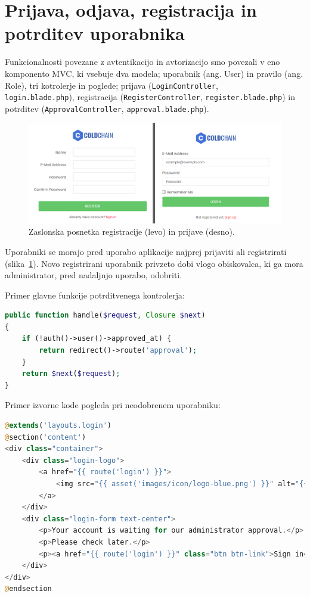 \documentclass[a4paper, 12pt]{book}
\begin{document}
\section{Prijava, odjava, registracija in potrditev uporabnika}

Funkcionalnosti povezane z avtentikacijo in avtorizacijo smo povezali v eno komponento MVC, ki vsebuje dva modela; uporabnik (ang. User) in pravilo (ang. Role), tri kotrolerje in poglede; prijava (\verb=LoginController=, \\ \verb=login.blade.php=), registracija (\verb=RegisterController=, \verb=register.blade.php=) in potrditev (\verb=ApprovalController=, \verb=approval.blade.php=).

\begin{figure}[h]
\begin{center}
\includegraphics[width=\textwidth]{slike/registration_login.png}
\end{center}
\caption{Zaslonska posnetka registracije (levo) in prijave (desno).}
\label{ss-registration-login}
\end{figure}

Uporabniki se morajo pred uporabo aplikacije najprej prijaviti ali registrirati (slika~\ref{ss-registration-login}). Novo registrirani uporabnik privzeto dobi vlogo obiskovalca, ki ga mora administrator, pred nadaljnjo uporabo, odobriti.

Primer glavne funkcije potrditvenega kontrolerja:

\begin{lstlisting}[language=PHP, style=mystyle]
public function handle($request, Closure $next)
{
    if (!auth()->user()->approved_at) {
        return redirect()->route('approval');
    }
    return $next($request);
}
\end{lstlisting}

\newpage 

Primer izvorne kode pogleda pri neodobrenem uporabniku:

\begin{lstlisting}[language=PHP, style=mystyle]
@extends('layouts.login')
@section('content')
<div class="container">
    <div class="login-logo">
        <a href="{{ route('login') }}">
            <img src="{{ asset('images/icon/logo-blue.png') }}" alt="{{ config('app.name') }}">
        </a>
    </div>
    <div class="login-form text-center">
        <p>Your account is waiting for our administrator approval.</p>
        <p>Please check later.</p>
        <p><a href="{{ route('login') }}" class="btn btn-link">Sign in</a></p>
    </div>
</div>
@endsection
\end{lstlisting}
\end{document}
